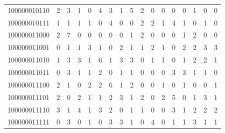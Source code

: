 \documentclass[10pt,a4paper]{article}
\begin{document}
\begin{longtable}{ |c|c|c|c|c|c|c|c|c|c|c|c|c|c|c|c|c| }
    100000010110              & 2                            & 3                                & 1                            & 0                              & 4   & 3   & 1   & 5   & 2   & 0   & 0   & 0   & 0   & 1   & 0   & 0   \\
    100000010111              & 1                            & 1                                & 1                            & 1                              & 0   & 4   & 0   & 0   & 2   & 2   & 1   & 4   & 1   & 0   & 1   & 0   \\
    100000011000              & 2                            & 7                                & 0                            & 0                              & 0   & 0   & 0   & 1   & 2   & 0   & 0   & 0   & 1   & 2   & 0   & 0   \\
    100000011001              & 0                            & 1                                & 1                            & 3                              & 1   & 0   & 2   & 1   & 1   & 2   & 1   & 0   & 2   & 2   & 3   & 3   \\
    100000011010              & 1                            & 3                                & 3                            & 1                              & 6   & 1   & 3   & 3   & 0   & 1   & 1   & 0   & 1   & 2   & 2   & 1   \\
    100000011011              & 0                            & 3                                & 1                            & 1                              & 2   & 0   & 1   & 1   & 0   & 0   & 0   & 3   & 3   & 1   & 1   & 0   \\
    100000011100              & 2                            & 1                                & 0                            & 2                              & 2   & 6   & 1   & 2   & 0   & 0   & 1   & 0   & 1   & 0   & 0   & 1   \\
    100000011101              & 2                            & 0                                & 2                            & 1                              & 1   & 2   & 3   & 1   & 2   & 0   & 2   & 5   & 0   & 1   & 3   & 1   \\
    100000011110              & 3                            & 1                                & 4                            & 1                              & 3   & 2   & 0   & 1   & 1   & 0   & 0   & 3   & 1   & 2   & 2   & 2   \\
    100000011111              & 0                            & 3                                & 0                            & 1                              & 0   & 3   & 3   & 1   & 0   & 4   & 0   & 1   & 1   & 3   & 1   & 1   \\

\end{longtable}
\end{document}
